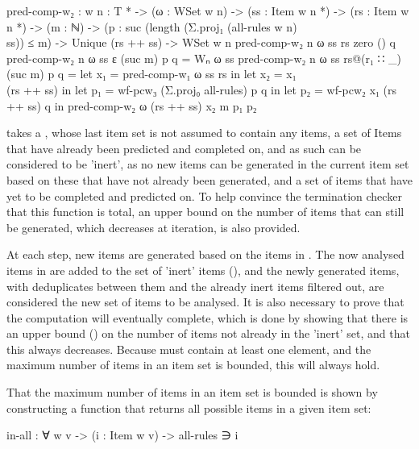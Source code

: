 		\begin{code}
			
			pred-comp-w₂ : {w n : T *} ->
			  (ω : WSet w n) ->
			  (ss : Item w n *) ->
			  (rs : Item w n *) ->
			  (m : ℕ) ->
			  (p : suc (length (Σ.proj₁ (all-rules {w} {n}) \\ ss)) ≤ m) ->
			  Unique (rs ++ ss) ->
			  WSet w n
			pred-comp-w₂ {n} ω ss rs zero () q
			pred-comp-w₂ {n} ω ss ε (suc m) p q = Wₙ ω ss
			pred-comp-w₂ {n} ω ss rs@(r₁ ∷ _) (suc m) p q =
			  let x₁ = pred-comp-w₁ ω ss rs in
			  let x₂ = x₁ \\ (rs ++ ss) in
			  let p₁ = wf-pcw₃ (Σ.proj₀ all-rules) p q in
			  let p₂ = wf-pcw₂ x₁ (rs ++ ss) q in
			  pred-comp-w₂ ω (rs ++ ss) x₂ m p₁ p₂
		
		\end{code}

		 takes a , whose last item set is not
		assumed to contain any items, a set of Items that have already been
		predicted and completed on, and as such can be considered to be
		'inert', as no new items can be generated in the current item set based
		on these that have not already been generated, and a set of items that
		have yet to be completed and predicted on. To help convince the
		termination checker that this function is total, an upper bound on the
		number of items that can still be generated, which decreases at
		iteration, is also provided.

		At each step, new items are generated based on the items in
		. The now analysed items in  are added to the set
		of 'inert' items (), and the newly generated items, with
		deduplicates between them and the already inert items filtered out, are
		considered the new set of items to be analysed. It is also necessary to
		prove that the computation will eventually complete, which is done by
		showing that there is an upper bound () on the number of items not already in the
		'inert' set, and that this always decreases. Because  must
		contain at least one element, and the maximum number of items in an 
		item set is bounded, this will always hold.
		
		That the maximum number of items in an item set is bounded is shown by 
		constructing a function that returns all possible items in a given item 
		set:
		
		\begin{code}

			in-all : ∀ {w v} -> (i : Item w v) -> all-rules ∋ i
		
		\end{code}

